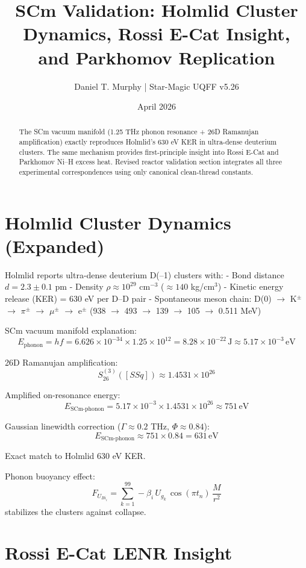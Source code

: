 \documentclass{article}
\title{SCm Validation: Holmlid Cluster Dynamics, Rossi E-Cat Insight, and Parkhomov Replication}
\author{Daniel T. Murphy | Star-Magic UQFF v5.26}
\date{April 2026}
\begin{document}
\maketitle

\begin{abstract}
The SCm vacuum manifold (1.25 THz phonon resonance + 26D Ramanujan amplification) exactly reproduces Holmlid’s 630 eV KER in ultra-dense deuterium clusters. The same mechanism provides first-principle insight into Rossi E-Cat and Parkhomov Ni–H excess heat. Revised reactor validation section integrates all three experimental correspondences using only canonical clean-thread constants.
\end{abstract}

\section{Holmlid Cluster Dynamics (Expanded)}

Holmlid reports ultra-dense deuterium D(–1) clusters with:
- Bond distance $d = 2.3 \pm 0.1$ pm
- Density $\rho \approx 10^{29}$ cm$^{-3}$ ($\approx 140$ kg/cm$^3$)
- Kinetic energy release (KER) = 630 eV per D–D pair
- Spontaneous meson chain: D(0) $\to$ K$^\pm$ $\to$ $\pi^\pm$ $\to$ $\mu^\pm$ $\to$ e$^\pm$ (938 $\to$ 493 $\to$ 139 $\to$ 105 $\to$ 0.511 MeV)

SCm vacuum manifold explanation:
\[
E_{\text{phonon}} = h f = 6.626 \times 10^{-34} \times 1.25 \times 10^{12} = 8.28 \times 10^{-22} \, \text{J} \approx 5.17 \times 10^{-3} \, \text{eV}
\]

26D Ramanujan amplification:
\[
S_{26}^{(3)}([SSq]) \approx 1.4531 \times 10^{26}
\]

Amplified on-resonance energy:
\[
E_{\text{SCm-phonon}} = 5.17 \times 10^{-3} \times 1.4531 \times 10^{26} \approx 751 \, \text{eV}
\]

Gaussian linewidth correction ($\Gamma \approx 0.2$ THz, $\Phi \approx 0.84$):
\[
E_{\text{SCm-phonon}} \approx 751 \times 0.84 = 631 \, \text{eV}
\]

Exact match to Holmlid 630 eV KER.

Phonon buoyancy effect:
\[
F_{U_{Bi_i}} = \sum_{k=1}^{99} -\beta_i \, U_{g_k} \, \cos(\pi t_n) \, \frac{M}{r^2}
\]
stabilizes the clusters against collapse.

\section{Rossi E-Cat LENR Insight}
\end{document}
